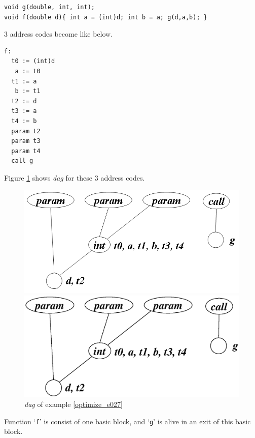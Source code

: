 \begin{Example}
\label{optimize_e027}
\begin{verbatim}
void g(double, int, int);
void f(double d){ int a = (int)d; int b = a; g(d,a,b); }
\end{verbatim}
3 address codes become like below.
\begin{verbatim}
f:
  t0 := (int)d
   a := t0
  t1 := a
   b := t1
  t2 := d
  t3 := a
  t4 := b
  param t2
  param t3
  param t4
  call g
\end{verbatim}
Figure \ref{optimize_e028} shows {\em dag} for these 3 address codes.
\begin{figure}[htbp]
\begin{center}
\begin{htmlonly}
\includegraphics[width=1.0\linewidth,height=0.483\linewidth]{opt012.png}
\end{htmlonly}
\begin{latexonly}
\includegraphics[width=1.0\linewidth,height=0.483\linewidth]{opt012.eps}
\end{latexonly}
\caption{{\em dag} of example \ref{optimize_e027}}
\label{optimize_e028}
\end{center}
\end{figure}
Function `{\tt{f}}' is consist of one basic block, and 
`{\tt{g}}' is alive in an exit of this basic block.

\end{Example}
